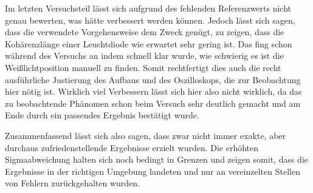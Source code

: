 \documentclass{article}
\begin{document}
Im letzten Versuchsteil lässt sich aufgrund des fehlenden Referenzwerts nicht genau bewerten, was hätte verbessert werden können. Jedoch lässt sich sagen, dass die verwendete Vorgehensweise dem Zweck genügt, zu zeigen, dass die Kohärenzlänge einer Leuchtdiode wie erwartet sehr gering ist. Das fing schon während des Versuchs an indem schnell klar wurde, wie schwierig es ist die Weißlichtposition manuell zu finden. Somit rechtfertigt dies auch die recht ausführliche Justierung des Aufbaus und des Oszilloskops, die zur Beobachtung hier nötig ist. Wirklich viel Verbessern lässt sich hier also nicht wirklich, da das zu beobachtende Phänomen schon beim Versuch sehr deutlich gemacht und am Ende durch ein passendes Ergebnis bestätigt wurde.

Zusammenfassend lässt sich also sagen, dass zwar nicht immer exakte, aber durchaus zufriedenstellende Ergebnisse erzielt wurden. Die erhöhten Sigmaabweichung halten sich noch bedingt in Grenzen und zeigen somit, dass die Ergebnisse in der richtigen Umgebung landeten und nur an vereinzelten Stellen von Fehlern zurückgehalten wurden. 

\newpage

\end{document}
